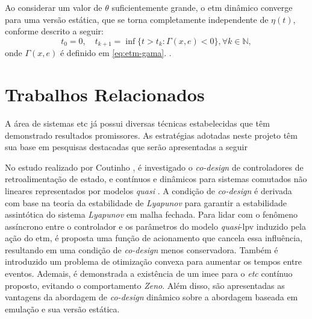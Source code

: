 Ao considerar um valor de $\theta$ suficientemente grande, o \acrshort{etm} dinâmico converge para uma versão estática, que se torna completamente independente de $\eta(t)$, conforme descrito a seguir: \begin{equation} t_0 = 0, \quad t_{k+1} = \inf\{t > t_k : \Gamma(x, e) < 0\}, \forall k \in \mathbb{N}, \end{equation} onde $\Gamma(x, e)$ é definido em \eqref{eq:etm-gama}. \cite{coutinho2021}.

\section{Trabalhos Relacionados}

A área de sistemas \acrshort{etc} já possui diversas técnicas estabelecidas que têm demonstrado resultados promissores. As estratégias adotadas neste projeto têm sua base em pesquisas destacadas que serão apresentadas a seguir

No estudo realizado por Coutinho \cite{coutinho2021}, é investigado o \textit{co-design} de controladores de retroalimentação de estado, e  contínuos e dinâmicos para sistemas comutados não lineares representados por modelos \textit{quasi} . A condição de \textit{co-design} é derivada com base na teoria da estabilidade de \textit{Lyapunov} para garantir a estabilidade assintótica do sistema \textit{Lyapunov} em malha fechada. Para lidar com o fenômeno assíncrono entre o controlador e os parâmetros do modelo \textit{quasi}-\acrshort{lpv} induzido pela ação do \acrshort{etm}, é proposta uma função de acionamento que cancela essa influência, resultando em uma condição de \textit{co-design} menos conservadora. Também é introduzido um problema de otimização convexa para aumentar os tempos entre eventos. Ademais, é demonstrada a existência de um \acrfull{imee} para o \textit{etc} contínuo proposto, evitando o comportamento \textit{Zeno}. Além disso, são apresentadas as vantagens da abordagem de \textit{co-design} dinâmico sobre a abordagem baseada em emulação e sua versão estática.

